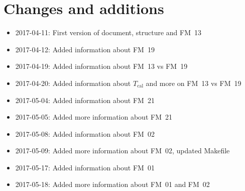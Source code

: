 \chapter{Changes and additions}
\label{ch:changes}

\begin{itemize}
    \item 2017-04-11: First version of document, structure and FM~13
    \item 2017-04-12: Added information about FM~19
    \item 2017-04-19: Added information about FM~13 vs FM~19
    \item 2017-04-20: Added information about $T_\mathrm{cal}$
                      and more on FM~13 vs FM~19
    \item 2017-05-04: Added information about FM~21
    \item 2017-05-05: Added more information about FM~21
    \item 2017-05-08: Added information about FM~02
    \item 2017-05-09: Added more information about FM~02, updated Makefile
    \item 2017-05-17: Added information about FM~01
    \item 2017-05-18: Added more information about FM~01 and FM~02
\end{itemize}
